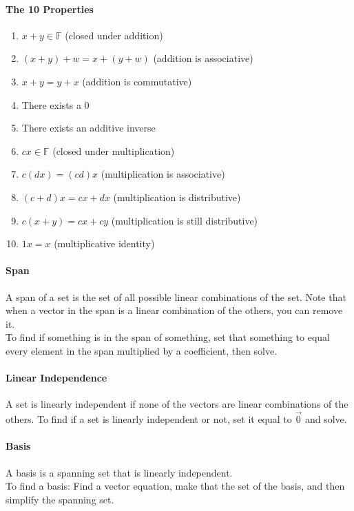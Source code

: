 \documentclass[10pt,letter]{article}
\begin{document}
\paragraph{The 10 Properties} \begin{enumerate}
    \item $x+y\in\mathbb{F}$ (closed under addition) 
    \item $(x+y)+w=x+(y+w)$ (addition is associative)
    \item $x+y=y+x$ (addition is commutative) 
    \item There exists a $0$ 
    \item There exists an additive inverse 
    \item $cx\in\mathbb{F}$ (closed under multiplication)
    \item $c(dx)=(cd)x$ (multiplication is associative) 
    \item $(c+d)x=cx+dx$ (multiplication is distributive)
    \item $c(x+y)=cx+cy$ (multiplication is still distributive)
    \item $1x=x$ (multiplicative identity) 
\end{enumerate}

\paragraph{Span} A span of a set is the set of all possible linear combinations of the set. Note that when a vector in the span is a linear combination of the others, you can remove it. \\ 
To find if something is in the span of something, set that something to equal every element in the span multiplied by a coefficient, then solve. 

\paragraph{Linear Independence} A set is linearly independent if none of the vectors are linear combinations of the others. To find if a set is linearly independent or not, set it equal to $\vec{0}$ and solve. 

\paragraph{Basis} A basis is a spanning set that is linearly independent. \\ 
To find a basis: Find a vector equation, make that the set of the basis, and then simplify the spanning set. 
\end{document}
